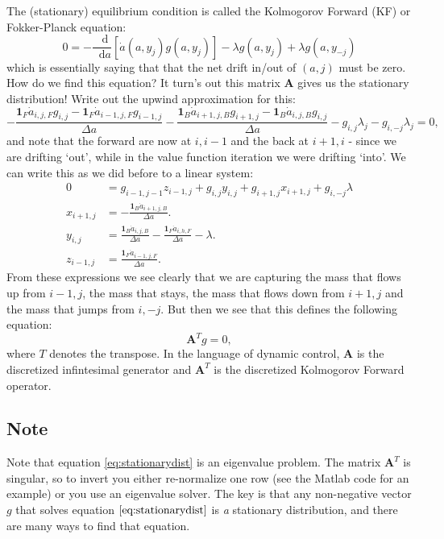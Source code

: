 \documentclass[12pt]{article}
\DeclareMathOperator{\1}{\mathbbm{1}}
\newcommand*\diff{\mathop{}\!\mathrm{d}}
\begin{document}
The (stationary) equilibrium condition is called the Kolmogorov Forward (KF) or Fokker-Planck equation:
\begin{equation}\label{eq:KF}
0 = - \frac{\diff}{\diff a} [\dot a(a,y_j)g(a,y_j)] - \lambda g(a,y_j) + \lambda g(a,y_{-j})
\end{equation}
which is essentially saying that that the net drift in/out of $(a,j)$ must be zero. How do we find this equation? It turn's out this matrix $\mathbf{A}$ gives us the stationary distribution! Write out the upwind approximation for this:
\begin{equation*}
-\frac{\mathbf{1}_F \dot a_{i,j,F} g_{i,j} - \mathbf{1}_F \dot a_{i-1,j,F} g_{i-1,j}}{\Delta a} - \frac{\mathbf{1}_B \dot a_{i+1,j,B} g_{i+1,j} - \mathbf{1}_B \dot a_{i,j,B} g_{i,j}}{\Delta a} - g_{i,j}\lambda_j - g_{i,-j}\lambda_j=0,
\end{equation*}
and note that the forward are now at $i,i-1$ and the back at $i+1,i$ - since we are drifting `out', while in the value function iteration we were drifting `into'. We can write this as we did before to a linear system:
\begin{align*}
0&=g_{i-1,j-1} z_{i-1,j} + g_{i,j} y_{i,j} + g_{i+1,j} x_{i+1,j} + g_{i,-j}\lambda \\
x_{i+1,j} &=  -\frac{\mathbf{1}_B \dot a_{i+1,j,B}}{\Delta a}. \\
y_{i,j} &=  \frac{\mathbf{1}_B \dot a_{i,j,B}}{\Delta a} -\frac{\mathbf{1}_F \dot a_{i,h,F}}{\Delta a} - \lambda. \\
z_{i-1,j} &= \frac{\mathbf{1}_F \dot a_{i-1,j,F}}{\Delta a}.
\end{align*}
From these expressions we see clearly that we are capturing the mass that flows up from $i-1,j$, the mass that stays, the mass that flows down from $i+1,j$ and the mass that jumps from $i,-j$. But then we see that this defines the following equation:
\begin{equation}\label{eq:stationarydist}
\mathbf{A}^{T}g = 0,
\end{equation}
where $T$ denotes the transpose. In the language of dynamic control, $\mathbf{A}$ is the discretized infintesimal generator and $\mathbf{A}^T$ is the discretized Kolmogorov Forward operator.

\subsection{Note}
Note that equation \eqref{eq:stationarydist} is an eigenvalue problem. The matrix $\mathbf{A}^T$ is singular, so to invert you either re-normalize one row (see the Matlab code for an example) or you use an eigenvalue solver. The key is that any non-negative vector $g$ that solves equation $\ref{eq:stationarydist}$   is \textit{a} stationary distribution, and there are many ways to find that equation.
\end{document}
